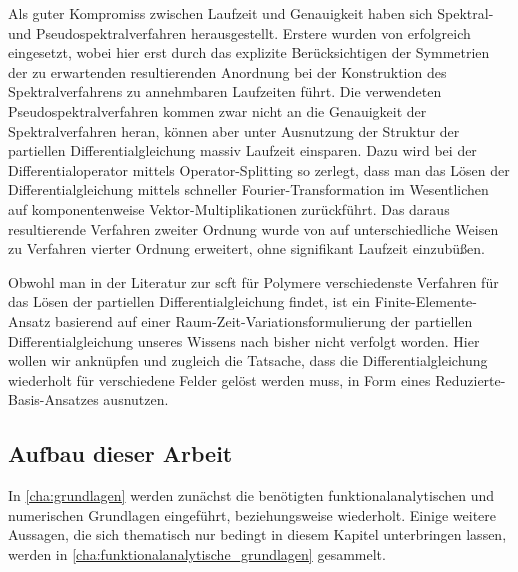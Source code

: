 Als guter Kompromiss zwischen Laufzeit und Genauigkeit haben sich Spektral- und Pseudospektralverfahren herausgestellt.
Erstere wurden von \textcite{Matsen:1994bz} erfolgreich eingesetzt, wobei hier erst durch das explizite Berücksichtigen der Symmetrien der zu erwartenden resultierenden Anordnung bei der Konstruktion des Spektralverfahrens zu annehmbaren Laufzeiten führt.
Die verwendeten Pseudospektralverfahren kommen zwar nicht an die Genauigkeit der Spektralverfahren heran, können aber unter Ausnutzung der Struktur der partiellen Differentialgleichung massiv Laufzeit einsparen.
Dazu wird bei \textcite{Rasmussen:2002kt} der Differentialoperator mittels Operator-Splitting so zerlegt, dass man das Lösen der Differentialgleichung mittels schneller Fourier-Transformation im Wesentlichen auf komponentenweise Vektor-Multiplikationen zurückführt.
Das daraus resultierende Verfahren zweiter Ordnung wurde von \textcite{GarciaCervera:2006uu,Ranjan:2007kl} auf unterschiedliche Weisen zu Verfahren vierter Ordnung erweitert, ohne signifikant Laufzeit einzubüßen.

Obwohl man in der Literatur zur \ac{scft} für Polymere verschiedenste Verfahren für das Lösen der partiellen Differentialgleichung findet, ist ein Finite-Elemente-Ansatz basierend auf einer Raum-Zeit-Variationsformulierung der partiellen Differentialgleichung unseres Wissens nach bisher nicht verfolgt worden.
Hier wollen wir anknüpfen und zugleich die Tatsache, dass die Differentialgleichung wiederholt für verschiedene Felder gelöst werden muss, in Form eines Reduzierte-Basis-Ansatzes ausnutzen.


\subsection*{Aufbau dieser Arbeit}


In \autoref{cha:grundlagen} werden zunächst die benötigten funktionalanalytischen und numerischen Grundlagen eingeführt, beziehungsweise wiederholt.
Einige weitere Aussagen, die sich thematisch nur bedingt in diesem Kapitel unterbringen lassen, werden in \autoref{cha:funktionalanalytische_grundlagen} gesammelt.

